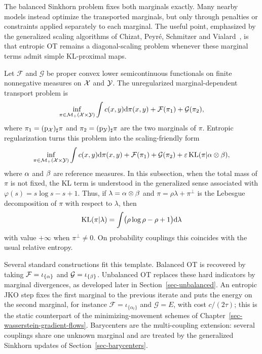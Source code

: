 The balanced Sinkhorn problem fixes both marginals exactly. Many nearby models instead optimize the transported marginals, but only through penalties or constraints applied separately to each marginal. The useful point, emphasized by the generalized scaling algorithms of Chizat, Peyr\'e, Schmitzer and Vialard~\cite{2016-chizat-sinkhorn}, is that entropic OT remains a diagonal-scaling problem whenever these marginal terms admit simple KL-proximal maps.

Let $\mathcal F$ and $\mathcal G$ be proper convex lower semicontinuous functionals on finite nonnegative measures on $\mathcal{X}$ and $\mathcal{Y}$. The unregularized marginal-dependent transport problem is
\begin{equation}\label{eq-marginal-dependent-unregularized-cont}
	\inf_{\pi\in\mathcal{M}_+(\mathcal{X}\times\mathcal{Y})}
	\int c(x,y)\mathrm{d}\pi(x,y)
	+
	\mathcal F(\pi_1)
	+
	\mathcal G(\pi_2),
\end{equation}
where $\pi_1=(\mathrm{p}_{\mathcal{X}})_\sharp\pi$ and $\pi_2=(\mathrm{p}_{\mathcal{Y}})_\sharp\pi$ are the two marginals of $\pi$. Entropic regularization turns this problem into the scaling-friendly form
\begin{equation}\label{eq-marginal-dependent-cont}
	\inf_{\pi\in\mathcal{M}_+(\mathcal{X}\times\mathcal{Y})}
	\int c(x,y)\mathrm{d}\pi(x,y)
	+
	\mathcal F(\pi_1)
	+
	\mathcal G(\pi_2)
	+
	\varepsilon\operatorname{KL}(\pi|\alpha\otimes\beta),
\end{equation}
where $\alpha$ and $\beta$ are reference measures. In this subsection, when the total mass of $\pi$ is not fixed, the KL term is understood in the generalized sense associated with $\varphi(s)=s\log s-s+1$. Thus, if $\lambda=\alpha\otimes\beta$ and $\pi=\rho\lambda+\pi^\perp$ is the Lebesgue decomposition of $\pi$ with respect to $\lambda$, then
\[
	\operatorname{KL}(\pi|\lambda)
	=
	\int \bigl(\rho\log\rho-\rho+1\bigr)\mathrm{d}\lambda
\]
with value $+\infty$ when $\pi^\perp\ne0$. On probability couplings this coincides with the usual relative entropy.

Several standard constructions fit this template. Balanced OT is recovered by taking $\mathcal F=\iota_{\{\alpha\}}$ and $\mathcal G=\iota_{\{\beta\}}$. Unbalanced OT replaces these hard indicators by marginal divergences, as developed later in Section~\ref{sec-unbalanced}. An entropic JKO step fixes the first marginal to the previous iterate and puts the energy on the second marginal, for instance $\mathcal F=\iota_{\{\alpha_t\}}$ and $\mathcal G=E$, with cost $c/(2\tau)$; this is the static counterpart of the minimizing-movement schemes of Chapter~\ref{sec-wasserstein-gradient-flows}. Barycenters are the multi-coupling extension: several couplings share one unknown marginal and are treated by the generalized Sinkhorn updates of Section~\ref{sec-barycenters}.

